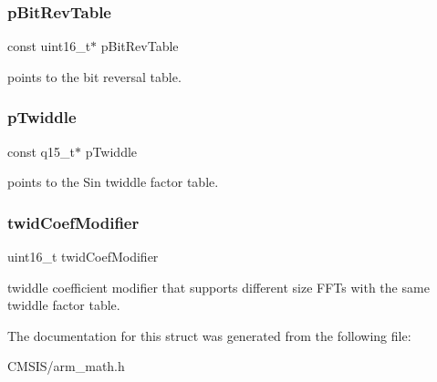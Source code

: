 \subsubsection{\texorpdfstring{pBitRevTable}{pBitRevTable}}
{\footnotesize\ttfamily const uint16\+\_\+t$\ast$ p\+Bit\+Rev\+Table}

points to the bit reversal table. \mbox{\label{structarm__cfft__radix2__instance__q15_a7f19217cfa0370f9e518caa882265386}} 
\subsubsection{\texorpdfstring{pTwiddle}{pTwiddle}}
{\footnotesize\ttfamily const q15\+\_\+t$\ast$ p\+Twiddle}

points to the Sin twiddle factor table. \mbox{\label{structarm__cfft__radix2__instance__q15_afe772e5b5001c9d8e85032115a8df5bf}} 
\subsubsection{\texorpdfstring{twidCoefModifier}{twidCoefModifier}}
{\footnotesize\ttfamily uint16\+\_\+t twid\+Coef\+Modifier}

twiddle coefficient modifier that supports different size F\+F\+Ts with the same twiddle factor table. 

The documentation for this struct was generated from the following file\+:\begin{DoxyCompactItemize}
\item 
C\+M\+S\+I\+S/arm\+\_\+math.\+h\end{DoxyCompactItemize}
